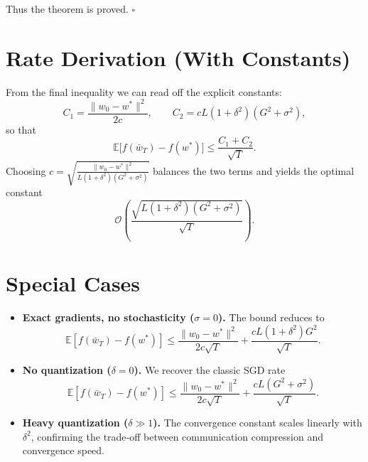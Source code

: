\documentclass{article}
\newcommand{\E}{\mathbb{E}}
\begin{document}
Thus the theorem is proved. \hfill\(\square\)

\section*{Rate Derivation (With Constants)}
From the final inequality we can read off the explicit constants:
\[
\boxed{
C_{1}= \frac{\|w_{0}-w^{*}\|^{2}}{2c},\qquad
C_{2}= cL(1+\delta^{2})(G^{2}+\sigma^{2}),
}
\]
so that
\[
\E\!\big[f(\bar w_{T})-f(w^{*})\big]\le \frac{C_{1}+C_{2}}{\sqrt{T}}.
\]
Choosing $c=\sqrt{\frac{\|w_{0}-w^{*}\|^{2}}{L(1+\delta^{2})(G^{2}+\sigma^{2})}}$ balances the two terms and yields the optimal constant
\[
\mathcal{O}\!\left(\frac{\sqrt{L(1+\delta^{2})(G^{2}+\sigma^{2})}}{\sqrt{T}}\right).
\]

\section*{Special Cases}
\begin{itemize}
\item \textbf{Exact gradients, no stochasticity ($\sigma=0$).} The bound reduces to
\[
\E[f(\bar w_{T})-f(w^{*})]\le \frac{\|w_{0}-w^{*}\|^{2}}{2c\sqrt{T}}+\frac{cL(1+\delta^{2})G^{2}}{\sqrt{T}}.
\]
\item \textbf{No quantization ($\delta=0$).} We recover the classic SGD rate
\[
\E[f(\bar w_{T})-f(w^{*})]\le \frac{\|w_{0}-w^{*}\|^{2}}{2c\sqrt{T}}+\frac{cL(G^{2}+\sigma^{2})}{\sqrt{T}}.
\]
\item \textbf{Heavy quantization ($\delta\gg1$).} The convergence constant scales linearly with $\delta^{2}$, confirming the trade‑off between communication compression and convergence speed.
\end{itemize}
\end{document}
